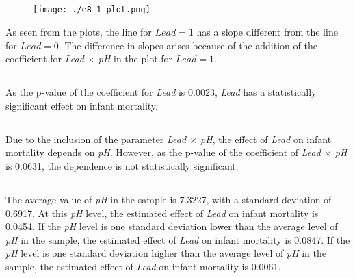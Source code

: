 \documentclass{./solution}
\begin{document}
\begin{solution}
            \subsection{}
                \vspace{-4mm}
                \begin{figure}[H]
                    \centering
                    \texttt{[image: ./e8\_1\_plot.png]}
                \end{figure}
                \vspace{-4mm}

                As seen from the plots, the line for $Lead = 1$ has a slope different from the line for $Lead = 0$.
                The difference in slopes arises because of the addition of the coefficient for \textit{Lead $\times$ pH} in the plot for $Lead = 1$.

            \subsection{}
                As the p-value of the coefficient for \textit{Lead} is 0.0023, \textit{Lead} has a statistically significant effect on infant mortality.

            \subsection{}
                Due to the inclusion of the parameter \textit{Lead $\times$ pH}, the effect of \textit{Lead} on infant mortality depends on \textit{pH}.
                However, as the p-value of the coefficient of \textit{Lead $\times$ pH} is 0.0631, the dependence is not statistically significant.

            \subsection{}
                The average value of \textit{pH} in the sample is 7.3227, with a standard deviation of 0.6917.
                At this \textit{pH} level, the estimated effect of \textit{Lead} on infant mortality is 0.0454.
                If the \textit{pH} level is one standard deviation lower than the average level of \textit{pH} in the sample, the estimated effect of \textit{Lead} on infant mortality is 0.0847.
                If the \textit{pH} level is one standard deviation higher than the average level of \textit{pH} in the sample, the estimated effect of \textit{Lead} on infant mortality is 0.0061.


\end{solution}
\end{document}
